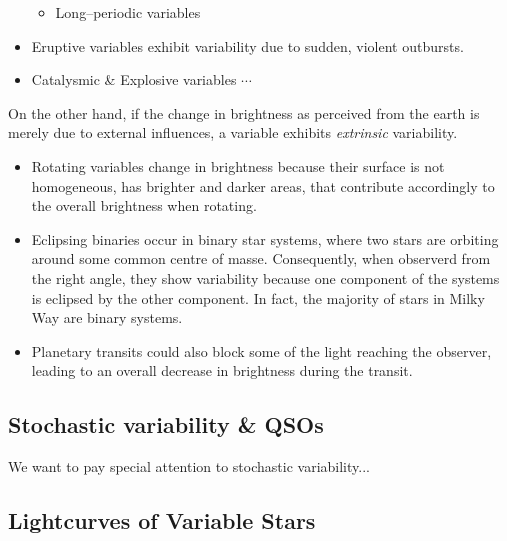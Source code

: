 \begin{itemize}
\begin{itemize}[label=$\circ$]
	\item Long--periodic variables
	\end{itemize}
\item Eruptive variables exhibit variability due to sudden, violent outbursts.
\item Catalysmic \& Explosive variables $\cdots$
\end{itemize}

On the other hand, if the change in brightness as perceived from the earth is merely due to external influences, a variable exhibits \emph{extrinsic} variability.

\begin{itemize}
\item Rotating variables change in brightness because their surface is not homogeneous, \eg has brighter and darker areas, that contribute accordingly to the overall brightness when rotating.
\item Eclipsing binaries occur in binary star systems, where two stars are orbiting around some common centre of masse. Consequently, when observerd from the right angle, they show variability because one component of the systems is eclipsed by the other component. In fact, the majority of stars in Milky Way are binary systems.
\item Planetary transits could also block some of the light reaching the observer, leading to an overall decrease in brightness during the transit.
\end{itemize}

\subsection{Stochastic variability \& QSOs}
 
We want to pay special attention to stochastic variability...
 

\subsection{Lightcurves of Variable Stars}


